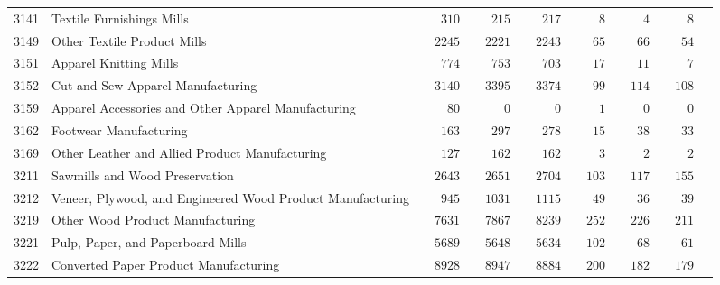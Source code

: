 \documentclass[9pt, oneside]{article}   	%
\begin{document}
\begin{longtable}{lp{3 in}ccccccc}
3141  & Textile Furnishings Mills & $\phantom{000}310$ & $\phantom{000}215$ & $\phantom{000}217$ & $\phantom{0000}8$ & $\phantom{0000}4$ & $\phantom{0000}8$ \\
3149  & Other Textile Product Mills & $\phantom{00}2245$ & $\phantom{00}2221$ & $\phantom{00}2243$ & $\phantom{000}65$ & $\phantom{000}66$ & $\phantom{000}54$ \\
3151  & Apparel Knitting Mills & $\phantom{000}774$ & $\phantom{000}753$ & $\phantom{000}703$ & $\phantom{000}17$ & $\phantom{000}11$ & $\phantom{0000}7$ \\
3152  & Cut and Sew Apparel Manufacturing & $\phantom{00}3140$ & $\phantom{00}3395$ & $\phantom{00}3374$ & $\phantom{000}99$ & $\phantom{00}114$ & $\phantom{00}108$ \\
3159  & Apparel Accessories and Other Apparel Manufacturing & $\phantom{0000}80$ & $\phantom{00000}0$ & $\phantom{00000}0$ & $\phantom{0000}1$ & $\phantom{0000}0$ & $\phantom{0000}0$ \\
3162  & Footwear Manufacturing & $\phantom{000}163$ & $\phantom{000}297$ & $\phantom{000}278$ & $\phantom{000}15$ & $\phantom{000}38$ & $\phantom{000}33$ \\
3169  & Other Leather and Allied Product Manufacturing & $\phantom{000}127$ & $\phantom{000}162$ & $\phantom{000}162$ & $\phantom{0000}3$ & $\phantom{0000}2$ & $\phantom{0000}2$ \\

3211  & Sawmills and Wood Preservation & $\phantom{00}2643$ & $\phantom{00}2651$ & $\phantom{00}2704$ & $\phantom{00}103$ & $\phantom{00}117$ & $\phantom{00}155$ \\
3212  & Veneer, Plywood, and Engineered Wood Product Manufacturing & $\phantom{000}945$ & $\phantom{00}1031$ & $\phantom{00}1115$ & $\phantom{000}49$ & $\phantom{000}36$ & $\phantom{000}39$ \\
3219  & Other Wood Product Manufacturing & $\phantom{00}7631$ & $\phantom{00}7867$ & $\phantom{00}8239$ & $\phantom{00}252$ & $\phantom{00}226$ & $\phantom{00}211$ \\

3221  & Pulp, Paper, and Paperboard Mills & $\phantom{00}5689$ & $\phantom{00}5648$ & $\phantom{00}5634$ & $\phantom{00}102$ & $\phantom{000}68$ & $\phantom{000}61$ \\
3222  & Converted Paper Product Manufacturing & $\phantom{00}8928$ & $\phantom{00}8947$ & $\phantom{00}8884$ & $\phantom{00}200$ & $\phantom{00}182$ & $\phantom{00}179$ \\


\end{longtable}
\end{document}
